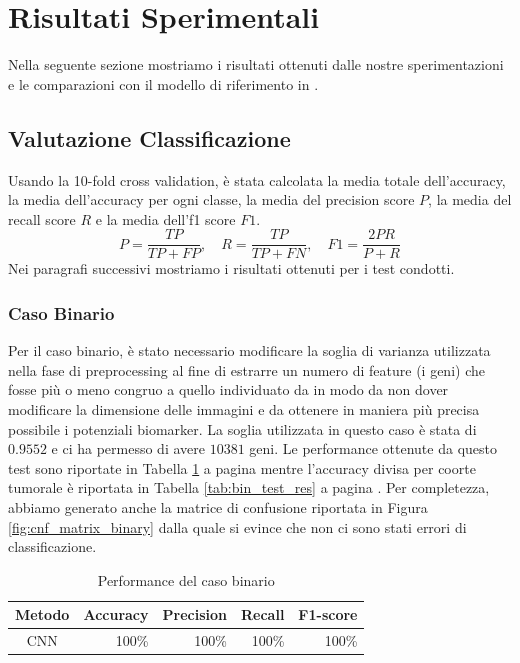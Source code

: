 \section{Risultati Sperimentali}
\label{sec:result}
Nella seguente sezione mostriamo i risultati ottenuti dalle nostre sperimentazioni e le
comparazioni con il modello di riferimento in \cite{lyu2018deep}.
\subsection{Valutazione Classificazione}
Usando la 10-fold cross validation, è stata calcolata la media totale dell'accuracy, la media dell'accuracy per ogni
classe, la media del precision score $P$, la media del recall score $R$ e la media dell'f1 score $F1$.
\begin{equation}
   P = \frac{TP}{TP + FP}, \quad R = \frac{TP}{TP + FN}, \quad F1 = \frac{2PR}{P + R} 
\end{equation}
Nei paragrafi successivi mostriamo i risultati ottenuti per i test condotti.

\subsubsection{Caso Binario}
Per il caso binario, è stato necessario modificare la soglia di varianza utilizzata nella fase di preprocessing
al fine di estrarre un numero di feature (i geni) che fosse più o meno congruo a quello individuato da
\cite{lyu2018deep} in modo da non dover modificare la dimensione delle immagini e da ottenere in maniera più precisa
possibile i potenziali biomarker. 
La soglia utilizzata in questo caso è stata di $0.9552$ e ci ha permesso di avere $10381$ geni.
Le performance ottenute da questo test sono riportate in Tabella \ref{tab:binary_score} a pagina
\pageref{tab:binary_score} mentre l'accuracy divisa per coorte tumorale è riportata in Tabella \ref{tab:bin_test_res}
a pagina \pageref{tab:bin_test_res}. Per completezza, abbiamo generato anche la matrice di confusione riportata in
Figura \ref{fig:cnf_matrix_binary} dalla quale si evince che non ci sono stati errori di classificazione.
\begin{table}[htbp!]
    \centering
    \caption{Performance del caso binario}
    \begin{tabular}{crrrr}
        \toprule
         Metodo & Accuracy & Precision & Recall & F1-score \\
         \midrule
         CNN    & 100\%    & 100\%     & 100\%  & 100\%     \\
         \bottomrule
    \end{tabular}
    \label{tab:binary_score}
\end{table}

